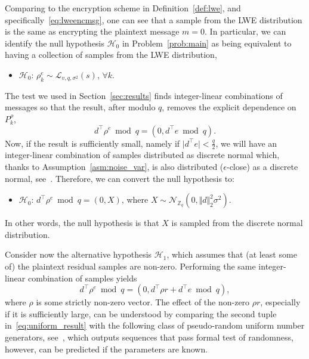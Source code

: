 \documentclass[journal, twoside, web]{ieeecolorpreprint}
\begin{document}
Comparing to the encryption scheme in Definition~\ref{def:lwe}, and specifically~\eqref{eq:lweencmsg}, one can see that a sample from the LWE distribution is the same as encrypting the plaintext message $m=0$. In particular, we can identify the null hypothesis $\mathcal{H}_0$ in Problem~\ref{prob:main} as being equivalent to having a collection of samples from the LWE distribution,
\begin{itemize}
    \item $\mathcal{H}_0$: $\rho_k^e\sim \mathcal{L}_{v,q,\sigma^2}(s)$, $\forall k$.
\end{itemize}

The test we used in Section~\ref{sec:results} finds integer-linear combinations of messages so that the result, after modulo $q$, removes the explicit dependence on $P_k^\rho$,
\begin{equation*}
    d^\top \rho^e \bmod q = (0, d^\top e \bmod q).
\end{equation*}
Now, if the result is sufficiently small, namely if $\vert d^\top e \vert < \frac{q}{2}$, we will have an integer-linear combination of samples distributed as discrete normal which, thanks to Assumption~\ref{asm:noise_var}, is also distributed ($\epsilon$-close) as a discrete normal, see~\cite{boneh2011}. Therefore, we can convert the null hypothesis to:
\begin{itemize}
    \item $\mathcal{H}_0$: $d^\top \rho^e \bmod q = (0,X)$, where $X\sim \mathcal{N}_{\mathbb{Z}_q}(0,\Vert d\Vert_2^2\sigma^2)$. 
\end{itemize}
In other words, the null hypothesis is that $X$ is sampled from the discrete normal distribution.

Consider now the alternative hypothesis $\mathcal{H}_1$, which assumes that (at least some of) the plaintext residual samples are non-zero. Performing the same integer-linear combination of samples yields
\begin{equation}\label{eq:uniform_result}
    d^\top \rho^e \bmod q = (0, d^\top \rho r + d^\top e \bmod q),
\end{equation}
where $\rho$ is some strictly non-zero vector. The effect of the non-zero $\rho r$, especially if it is sufficiently large, can be understood by comparing the second tuple in~\eqref{eq:uniform_result} with the following class of pseudo-random uniform number generators, see~\cite{rotenberg60}, which outputs sequences that pass formal test of randomness, however, can be predicted if the parameters are known.
\end{document}
